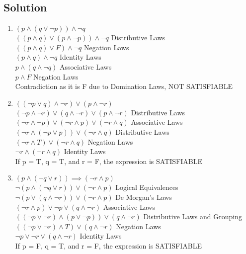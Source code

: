 \documentclass[11pt]{article}
\begin{document}
    \subsection*{Solution}
    \begin{enumerate}[label=(\alph*)]
        \item \((p \land (q \lor \neg p)) \land \neg q\) \\
        \(((p \land q) \lor (p \land \neg p)) \land \neg q\) Distributive Laws \\
        \(((p \land q) \lor F) \land \neg q\) Negation Laws \\
        \((p \land q) \land \neg q\) Identity Laws \\
        \(p \land (q \land \neg q)\) Associative Laws \\
        \(p \land F\) Negation Laws \\
        Contradiction as it is F due to Domination Laws, NOT SATISFIABLE
        \item \(((\neg p \lor q) \land \neg r) \lor (p \land \neg r)\) \\
        \((\neg p \land \neg r ) \lor (q \land \neg r) \lor (p \land \neg r)\) Distributive Laws \\
        \((\neg r \land \neg p) \lor (\neg r \land p) \lor (\neg r \land q)\) Associative Laws \\
        \((\neg r \land (\neg p \lor p)) \lor (\neg r \land q)\) Distributive Laws \\
        \((\neg r \land T) \lor (\neg r \land q)\) Negation Laws \\
        \(\neg r \land (\neg r \land q)\) Identity Laws \\
        If p = T, q = T, and r = F, the expression is SATISFIABLE
        \item \((p \land (\neg q \lor r)) \implies (\neg r \land p)\) \\
        \(\neg (p \land (\neg q \lor r)) \lor (\neg r \land p)\) Logical Equivalences \\
        \(\neg (p \lor (q \land \neg r)) \lor (\neg r \land p)\) De Morgan's Laws \\
        \((\neg r \land p) \lor \neg p \lor (q \land \neg r)\) Associative Laws \\
        \(((\neg p \lor \neg r) \land (p \lor \neg p)) \lor (q \land \neg r)\) Distributive Laws and Grouping \\
        \(((\neg p \lor \neg r) \land T) \lor (q \land \neg r)\) Negation Laws \\
        \(\neg p \lor \neg r \lor (q \land \neg r)\) Identity Laws \\
        If p = F, q = T, and r = F, the expression is SATISFIABLE
        
    \end{enumerate}
\end{document}
